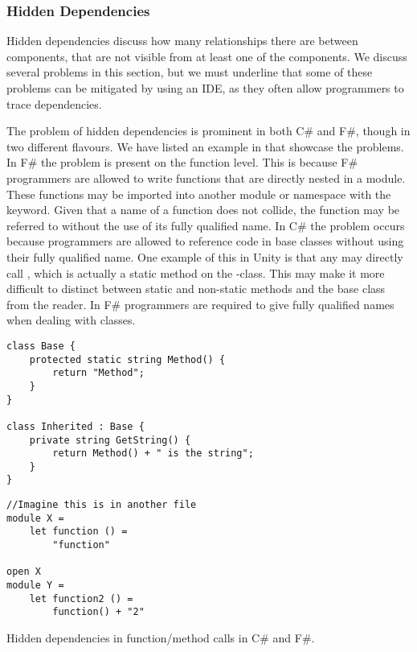 \subsubsection{Hidden Dependencies}
Hidden dependencies discuss how many relationships there are between components, that are not visible from at least one of the components. We discuss several problems in this section, but we must underline that some of these problems can be mitigated by using an \gls{IDE}, as they often allow programmers to trace dependencies.

The problem of hidden dependencies is prominent in both C\# and F\#, though in two different flavours. We have listed an example in  that showcase the problems. In F\# the problem is present on the function level. This is because F\# programmers are allowed to write functions that are directly nested in a module. These functions may be imported into another module or namespace with the  keyword. Given that a name of a function does not collide, the function may be referred to without the use of its fully qualified name. In C\# the problem occurs because programmers are allowed to reference code in base classes without using their fully qualified name. One example of this in Unity is that any  may directly call , which is actually a static method on the -class. This may make it more difficult to distinct between static and non-static methods and  the base class from the reader. In F\# programmers are required to give fully qualified names when dealing with classes.

\begin{listing}[H]
    \begin{minipage}{.50\textwidth}
        \begin{verbatim}
class Base {
    protected static string Method() {
        return "Method";
    }
}

class Inherited : Base {
    private string GetString() {
        return Method() + " is the string";
    }
}
        \end{verbatim}
    \end{minipage}
    \hfill
    \begin{minipage}{.40\textwidth}
        \begin{verbatim}
//Imagine this is in another file
module X =
    let function () =
        "function"

open X
module Y =
    let function2 () =
        function() + "2"
        \end{verbatim}
    \end{minipage}
\caption{Hidden dependencies in function/method calls in C\# and F\#.}
\label{lst:hidden:dependencies}
\end{listing}

